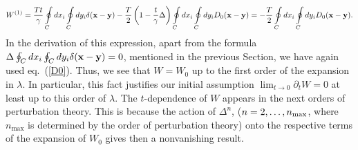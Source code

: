 \documentclass[a4paper,12pt]{article}
\begin{document}
$$
W^{(1)}=\frac{Tt}{\gamma}\oint\limits_{C}^{}dx_i
\oint\limits_{C}^{}dy_i\delta({\bf x}-{\bf y})-\frac{T}{2}\left(1-\frac{t}{\gamma}\Delta\right)
\oint\limits_{C}^{}dx_i\oint\limits_{C}^{}dy_iD_0({\bf x}-{\bf y})=
-\frac{T}{2}\oint\limits_{C}^{}dx_i\oint\limits_{C}^{}dy_iD_0({\bf x}-{\bf y}).$$
In the derivation of this expression, apart from the formula
$\Delta\oint_{C}^{}dx_i
\oint_{C}^{}dy_i\delta({\bf x}-{\bf y})=0$, mentioned in the previous Section, we have again used
eq.~(\ref{D0}).
Thus, we see that $W=W_0$ up to the first order of the expansion in $\lambda$. In particular,
this fact justifies our initial assumption $\lim_{t\to 0}^{}\partial_tW=0$ at least up to this order of $\lambda$.
The $t$-dependence of $W$ appears in the next orders of perturbation theory. This is because the action of $\Delta^n$,
($n=2,\ldots,n_{\rm max}$, where $n_{\max}$ is determined by the order of perturbation theory)
onto the respective terms of the expansion of $W_0$ gives then a nonvanishing result.
\end{document}
